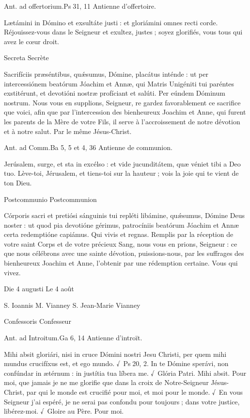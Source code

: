\begin{paracol}{2}
Ant. ad offertorium.\hfill Ps 31, 11
\switchcolumn
Antienne d’offertoire.
\switchcolumn*

Lætámini in Dómino et exsultáte justi : et gloriámini omnes recti corde.
\switchcolumn
Réjouissez-vous dans le Seigneur et exultez, justes ; soyez glorifiés, vous tous qui avez le cœur droit.
\switchcolumn*

Secreta
\switchcolumn
Secrète
\switchcolumn*

Sacrifíciis præséntibus, quǽsumus,  Dómine, placátus inténde : ut per intercessiónem beatórum Jóachim et Annæ, qui Matris Unigéniti tui paréntes exstitérunt, et devotióni nostræ profíciant et salúti. Per eúndem Dóminum nostrum.
\switchcolumn
Nous vous en supplions, Seigneur, re gardez favorablement ce sacrifice que voici, afin que par l’intercession des bienheureux Joachim et Anne, qui furent les parents de la Mère de votre Fils, il serve à l’accroissement de notre dévotion et à notre salut. Par le même Jésus-Christ.
\switchcolumn*

Ant. ad Comm.\hfill Ba 5, 5 et 4, 36
\switchcolumn
Antienne de communion.
\switchcolumn*

Jerúsalem, surge, et sta in excélso : et vide jucunditátem, quæ véniet tibi a Deo tuo.
\switchcolumn
Lève-toi, Jérusalem, et tiens-toi sur la hauteur ; vois la joie qui te vient de ton Dieu.
\switchcolumn*

Postcommunio
\switchcolumn
Postcommunion
\switchcolumn*

Córporis sacri et pretiósi sánguinis  tui repléti libámine, quǽsumus, Dómine Deus noster : ut quod pia devotióne gérimus, patrocíniis beatórum Jóachim et Annæ certa redemptióne capiámus. Qui vivis et regnas.
\switchcolumn
Remplis par la réception de votre saint  Corps et de votre précieux Sang, nous vous en prions, Seigneur : ce que nous célébrons avec une sainte dévotion, puissions-nous, par les suffrages des bienheureux Joachim et Anne, l’obtenir par une rédemption certaine. Vous qui vivez.
\switchcolumn*

Die 4 augusti
\switchcolumn
Le 4 août
\switchcolumn*

S. Ioannis M. Vianney
\switchcolumn
S. Jean-Marie Vianney
\switchcolumn*

Confessoris
\switchcolumn
Confesseur
\switchcolumn*

Ant. ad Introitum.\hfill Ga 6, 14
\switchcolumn
Antienne d’introït.
\switchcolumn*

Mihi absit gloriári, nisi in cruce  Dómini nostri Jesu Christi, per quem mihi mundus crucifíxus est, et ego mundo. √~Ps 20, 2. In te Dómine sperávi, non confúndar in ætérnum : in justítia tua líbera me. √~Glória Patri. Mihi absit.
\switchcolumn
Pour moi, que jamais je ne me glorifie  que dans la croix de Notre-Seigneur Jésus-Christ, par qui le monde est crucifié pour moi, et moi pour le monde. √~En vous Seigneur j’ai espéré, je ne serai pas confondu pour toujours ; dans votre justice, libérez-moi. √~Gloire au Père. Pour moi.
\switchcolumn*


\end{paracol}
